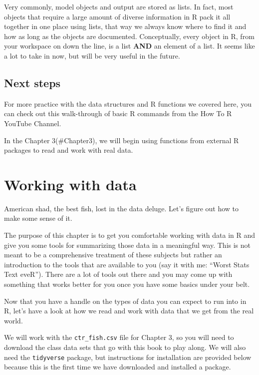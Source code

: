\documentclass[
]{book}
\begin{document}
Very commonly, model objects and output are stored as lists. In fact, most objects that require a large amount of diverse information in R pack it all together in one place using lists, that way we always know where to find it and how as long as the objects are documented. Conceptually, every object in R, from your workspace on down the line, is a list \textbf{AND} an element of a list. It seems like a lot to take in now, but will be very useful in the future.

\hypertarget{next2}{%
\section{Next steps}\label{next2}}

For more practice with the data structures and R functions we covered here, you can check out this walk-through of basic R commands from the How To R YouTube Channel.

In the Chapter 3(\#Chapter3), we will begin using functions from external R packages to read and work with real data.

\hypertarget{Chapter3}{%
\chapter{Working with data}\label{Chapter3}}

American shad, the best fish, lost in the data deluge. Let's figure out how to make some sense of it.

The purpose of this chapter is to get you comfortable working with data in R and give you some tools for summarizing those data in a meaningful way. This is not meant to be a comprehensive treatment of these subjects but rather an introduction to the tools that are available to you (say it with me: ``Worst Stats Text eveR''). There are a lot of tools out there and you may come up with something that works better for you once you have some basics under your belt.

Now that you have a handle on the types of data you can expect to run into in R, let's have a look at how we read and work with data that we get from the real world.

We will work with the \texttt{ctr\_fish.csv} file for Chapter 3, so you will need to download the class data sets that go with this book to play along. We will also need the \texttt{tidyverse} package, but instructions for installation are provided below because this is the first time we have downloaded and installed a package.
\end{document}
